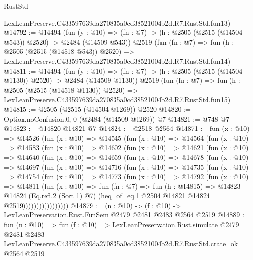 \begin{lexlean}{RustStd}
\begin{coremodule}
    LexLeanPreserve.C433597639da270835a0cd38521004b2d.R7.RustStd.fun13)
@14792 := @14494
    (fun (y : @10) => (fn : @7) -> (h : @2505 (@2515 (@14504 @543)) @2520) -> @2484 (@14509 @543))
    @2519
    (fun (fn : @7) =>
    fun (h : @2505 (@2515 (@14518 @543)) @2520) =>
    LexLeanPreserve.C433597639da270835a0cd38521004b2d.R7.RustStd.fun14)
@14811 := @14494
    (fun (y : @10) => (fn : @7) -> (h : @2505 (@2515 (@14504 @1130)) @2520) -> @2484 (@14509 @1130))
    @2519
    (fun (fn : @7) =>
    fun (h : @2505 (@2515 (@14518 @1130)) @2520) =>
    LexLeanPreserve.C433597639da270835a0cd38521004b2d.R7.RustStd.fun15)
@14815 := @2505 (@2515 (@14504 @1269)) @2520
@14820 := Option.noConfusion.{0, 0} (@2484 (@14509 @1269)) @7
@14821 := @748 @7
@14823 := @14820 @14821 @7
@14824 := @2518 @2564
@14871 := fun (x : @10) =>
  @14526
    (fun (x : @10) =>
    @14545
      (fun (x : @10) =>
      @14564
        (fun (x : @10) =>
        @14583
          (fun (x : @10) =>
          @14602
            (fun (x : @10) =>
            @14621
              (fun (x : @10) =>
              @14640
                (fun (x : @10) =>
                @14659
                  (fun (x : @10) =>
                  @14678
                    (fun (x : @10) =>
                    @14697
                      (fun (x : @10) =>
                      @14716
                        (fun (x : @10) =>
                        @14735
                          (fun (x : @10) =>
                          @14754
                            (fun (x : @10) =>
                            @14773
                              (fun (x : @10) =>
                              @14792
                                (fun (x : @10) =>
                                @14811
                                  (fun (x : @10) =>
                                  fun (fn : @7) =>
                                  fun (h : @14815) =>
                                  @14823
                                    @14824
                                    (Eq.refl.{2} (Sort 1) @7)
                                    (heq_of_eq.{1} @2504 @14821 @14824 @2519)))))))))))))))))
@14879 := (n : @10) -> (f : @10) -> LexLeanPreservation.Rust.FunSem @2479 @2481 @2483 @2564 @2519
@14889 := fun (n : @10) =>
  fun (f : @10) =>
  LexLeanPreservation.Rust.simulate
    @2479
    @2481
    @2483
    LexLeanPreserve.C433597639da270835a0cd38521004b2d.R7.RustStd.crate_ok
    @2564
    @2519
\end{coremodule}
\end{lexlean}
